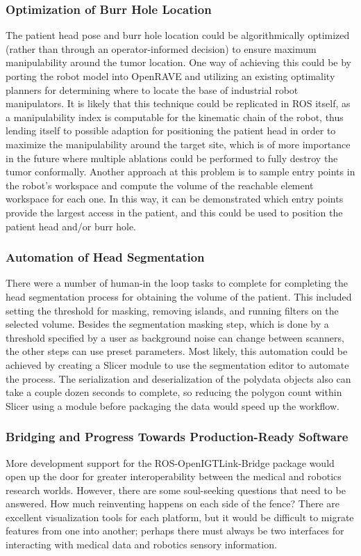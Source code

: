 \documentclass[12pt]{report}
\begin{document}
\subsubsection{Optimization of Burr Hole Location}
The patient head pose and burr hole location could be algorithmically optimized (rather than through an operator-informed decision) to ensure maximum manipulability around the tumor location. One way of achieving this could be by porting the robot model into OpenRAVE and utilizing an existing optimality planners for determining where to locate the base of industrial robot manipulators. \cite{workspaceChecker} It is likely that this technique could be replicated in ROS itself, as a manipulability index is computable for the kinematic chain of the robot, thus lending itself to possible adaption for positioning the patient head in order to maximize the manipulability around the target site, which is of more importance in the future where multiple ablations could be performed to fully destroy the tumor conformally. Another approach at this problem is to sample entry points in the robot's workspace and compute the volume of the reachable element workspace for each one. In this way, it can be demonstrated which entry points provide the largest access in the patient, and this could be used to position the patient head and/or burr hole.

\subsubsection{Automation of Head Segmentation}
There were a number of human-in the loop tasks to complete for completing the head segmentation process for obtaining the volume of the patient. This included setting the threshold for masking, removing islands, and running filters on the selected volume. Besides the segmentation masking step, which is done by a threshold specified by a user as background noise can change between scanners, the other steps can use preset parameters. Most likely, this automation could be achieved by creating a Slicer module to use the segmentation editor to automate the process. The serialization and deserialization of the polydata objects also can take a couple dozen seconds to complete, so reducing the polygon count within Slicer using a module before packaging the data would speed up the workflow.

\subsubsection{Bridging and Progress Towards Production-Ready Software}
More development support for the ROS-OpenIGTLink-Bridge package would open up the door for greater interoperability between the medical and robotics research worlds. However, there are some soul-seeking questions that need to be answered. How much reinventing happens on each side of the fence? There are excellent visualization tools for each platform, but it would be difficult to migrate features from one into another; perhaps there must always be two interfaces for interacting with medical data and robotics sensory information. 
\end{document}
